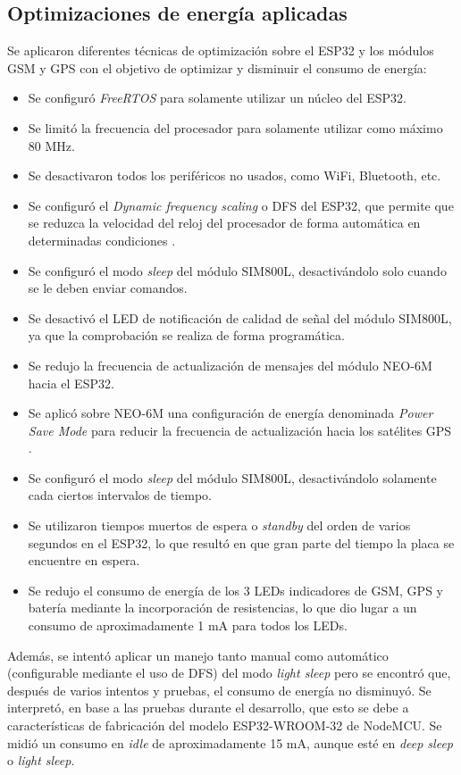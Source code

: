 \subsection{Optimizaciones de energía aplicadas}

Se aplicaron diferentes técnicas de optimización sobre el ESP32 y los módulos GSM y GPS con el objetivo de optimizar y disminuir el consumo de energía:
\begin{itemize}
	\item Se configuró \textit{FreeRTOS} para solamente utilizar un núcleo del ESP32.
	\item Se limitó la frecuencia del procesador para solamente utilizar como máximo 80 MHz.
	\item Se desactivaron todos los periféricos no usados, como WiFi, Bluetooth, etc.
	\item Se configuró el \textit{Dynamic frequency scaling} o DFS del ESP32, que permite que se reduzca la velocidad del reloj del procesador de forma automática en determinadas condiciones \citep{ESP32:2}.
	\item Se configuró el modo \textit{sleep} del módulo SIM800L, desactivándolo solo cuando se le deben enviar comandos.
	\item Se desactivó el LED de notificación de calidad de señal del módulo SIM800L, ya que la comprobación se realiza de forma programática.
	\item Se redujo la frecuencia de actualización de mensajes del módulo NEO-6M hacia el ESP32.
	\item Se aplicó sobre NEO-6M una configuración de energía denominada \textit{Power Save Mode} para reducir la frecuencia de actualización hacia los satélites GPS \citep{NEO6M:2}.
	\item Se configuró el modo \textit{sleep} del módulo SIM800L, desactivándolo solamente cada ciertos intervalos de tiempo.
	\item Se utilizaron tiempos muertos de espera o \textit{standby} del orden de varios segundos en el ESP32, lo que resultó en que gran parte del tiempo la placa se encuentre en espera.
	\item Se redujo el consumo de energía de los 3 LEDs indicadores de GSM, GPS y batería mediante la incorporación de resistencias, lo que dio lugar a un consumo de aproximadamente 1 mA para todos los LEDs.
\end{itemize}

Además, se intentó aplicar un manejo tanto manual como automático (configurable mediante el uso de DFS) del modo \textit{light sleep} pero se encontró que, después de varios intentos y pruebas, el consumo de energía no disminuyó. Se interpretó, en base a las pruebas durante el desarrollo, que esto se debe a características de fabricación del modelo ESP32-WROOM-32 de NodeMCU. Se midió un consumo en \textit{idle} de aproximadamente 15 mA, aunque esté en \textit{deep sleep} o \textit{light sleep}.

